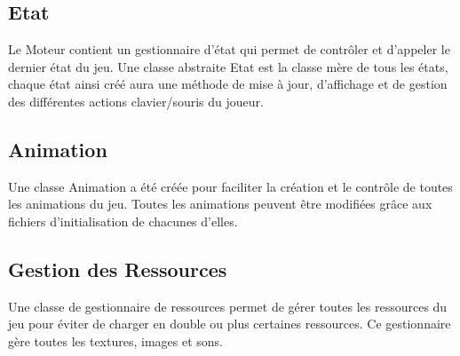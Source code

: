 \documentclass[a4paper]{article}
\newcommand{\alinea}{\hspace*{0.5cm}}
\begin{document}
      \subsection{Etat}
        \alinea Le Moteur contient un gestionnaire d'état qui permet de contrôler et d'appeler le dernier état du jeu. Une classe abstraite Etat est la classe mère de tous les états, chaque état ainsi créé aura une méthode de mise à jour, d'affichage et de gestion des différentes actions clavier/souris du joueur.
        
      \subsection{Animation}
        \alinea Une classe Animation a été créée pour faciliter la création et le contrôle de toutes les animations du jeu. Toutes les animations peuvent être modifiées grâce aux fichiers d'initialisation de chacunes d'elles.
        
      \subsection{Gestion des Ressources}
        \alinea Une classe de gestionnaire de ressources permet de gérer toutes les ressources du jeu pour éviter de charger en double ou plus certaines ressources. Ce gestionnaire gère toutes les textures, images et sons.
\end{document}
